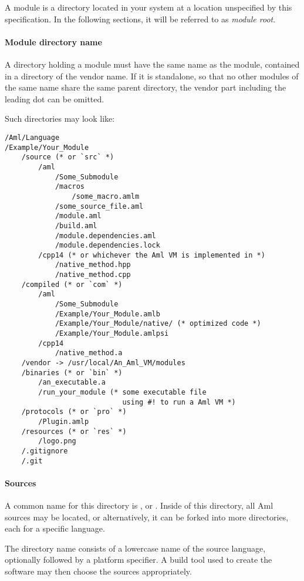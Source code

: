 A module is a directory located in your system at a location unspecified by this specification. In the following sections, it will be referred to as {\em module root}. 

\paragraph{Module directory name}
A directory holding a module must have the same name as the module, contained in a directory of the vendor name. If it is standalone, so that no other modules of the same name share the same parent directory, the vendor part including the leading dot can be omitted.

\example Such directories may look like:
\begin{lstlisting}[deletekeywords={module},mathescape=false]
/Aml/Language
/Example/Your_Module
    /source (* or `src` *)
        /aml
            /Some_Submodule 
            /macros
                /some_macro.amlm
            /some_source_file.aml
            /module.aml
            /build.aml
            /module.dependencies.aml
            /module.dependencies.lock
        /cpp14 (* or whichever the Aml VM is implemented in *)
            /native_method.hpp
            /native_method.cpp
    /compiled (* or `com` *)
        /aml
            /Some_Submodule
            /Example/Your_Module.amlb
            /Example/Your_Module/native/ (* optimized code *)
            /Example/Your_Module.amlpsi
        /cpp14
            /native_method.a
    /vendor -> /usr/local/An_Aml_VM/modules
    /binaries (* or `bin` *)
        /an_executable.a
        /run_your_module (* some executable file 
                            using #! to run a Aml VM *)
    /protocols (* or `pro` *)
        /Plugin.amlp
    /resources (* or `res` *)
        /logo.png
    /.gitignore
    /.git
\end{lstlisting} 

\paragraph{Sources}
A common name for this directory is , or . Inside of this directory, all Aml sources may be located, or alternatively, it can be forked into more directories, each for a specific language. 

The directory name consists of a lowercase name of the source language, optionally followed by a platform specifier. A build tool used to create the software may then choose the sources appropriately. 

